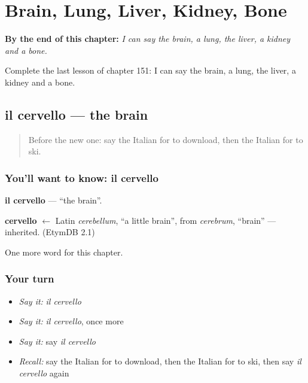 
\chapter{Brain, Lung, Liver, Kidney, Bone}
\label{ch:it-brain-lung-liver-kidney-bone}

\begin{chapteropening}
\textbf{By the end of this chapter:} \emph{I can say the brain, a lung, the liver, a kidney and a bone.}

Complete the last lesson of chapter 151: I can say the brain, a lung, the liver, a kidney and a bone.
\end{chapteropening}

\section[il cervello]{il cervello — the brain}

\label{lesson:IT-C151-cervello}



\begin{quote}
Before the new one: say the Italian for to download, then the Italian for to ski.
\end{quote}

\subsection*{You'll want to know: il cervello}
\textbf{il cervello} — \textquotedblleft{}the brain\textquotedblright{}.

\begin{cousinweb}
\textbf{cervello} $\leftarrow$ Latin \emph{cerebellum}, \textquotedblleft{}a little brain\textquotedblright{}, from \emph{cerebrum}, \textquotedblleft{}brain\textquotedblright{} — inherited. (EtymDB 2.1)
\end{cousinweb}

\begin{grammarlens}[title={What you've built}]
One more word for this chapter.
\end{grammarlens}

\subsection*{Your turn}
\begin{itemize}
\raggedright
  \item \emph{Say it:} \emph{il cervello}
  \item \emph{Say it:} \emph{il cervello}, once more
  \item \emph{Say it:} say \emph{il cervello}
  \item \emph{Recall:} say the Italian for to download, then the Italian for to ski, then say \emph{il cervello} again
\end{itemize}

